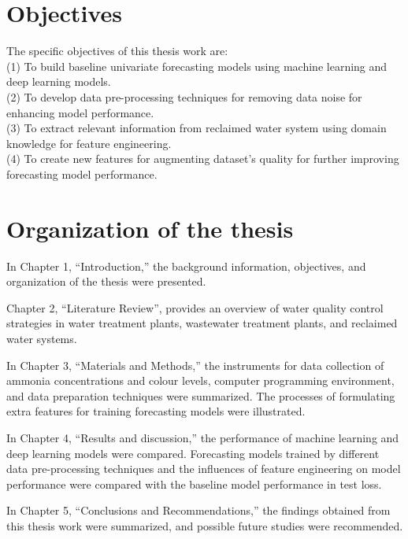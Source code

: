 \section{Objectives}
\noindent
The specific objectives of this thesis work are:\\
(1) To build baseline univariate forecasting models using machine learning and deep learning models.\\
(2) To develop data pre-processing techniques for removing data noise for enhancing model performance.\\
(3) To extract relevant information from reclaimed water system using domain knowledge for feature engineering.\\
(4) To create new features for augmenting dataset's quality for further improving forecasting model performance.

\section{Organization of the thesis}
In Chapter 1, “Introduction,” the background information, objectives, and organization of the thesis were presented.

Chapter 2, “Literature Review”, provides an overview of water quality control strategies in water treatment plants, wastewater treatment plants, and reclaimed water systems.

In Chapter 3, “Materials and Methods,” the instruments for data collection of ammonia concentrations and colour levels, computer programming environment, and data preparation techniques were summarized. The processes of formulating extra features for training forecasting models were illustrated.

In Chapter 4, “Results and discussion,” the performance of machine learning and deep learning models were compared. Forecasting models trained by different data pre-processing techniques and the influences of feature engineering on model performance were compared with the baseline model performance in test loss. 

In Chapter 5, “Conclusions and Recommendations,” the findings obtained from this thesis work were summarized, and possible future studies were recommended.